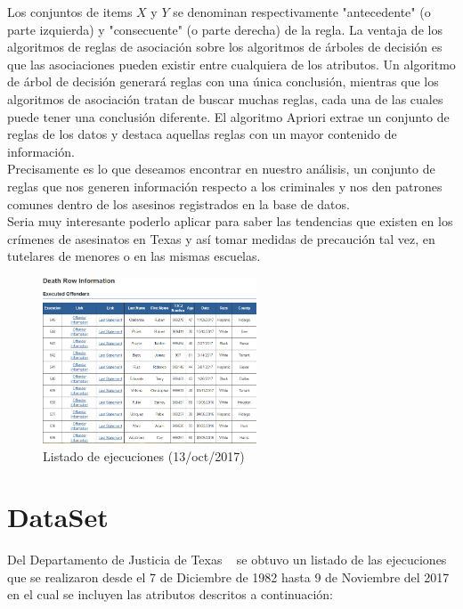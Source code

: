 \documentclass[sigconf]{acmart}
\begin{document}
Los conjuntos de items $X$ y $Y$ se denominan respectivamente "antecedente" (o parte izquierda) y "consecuente" (o parte derecha) de la regla.
La ventaja de los algoritmos de reglas de asociación sobre los algoritmos de árboles de decisión es que las asociaciones pueden existir entre cualquiera de los atributos. Un algoritmo de árbol de decisión generará reglas con una única conclusión, mientras que los algoritmos de asociación tratan de buscar muchas reglas, cada una de las cuales puede tener una conclusión diferente.
El algoritmo Apriori extrae un conjunto de reglas de los datos y destaca aquellas reglas con un mayor contenido de información.\\ Precisamente es lo que deseamos encontrar en nuestro análisis, un conjunto de reglas que nos generen información respecto a los criminales y nos den patrones comunes dentro de los asesinos registrados en la base de datos.\\Seria muy interesante poderlo aplicar para saber las tendencias que existen en los crímenes de asesinatos en Texas y así tomar medidas de precaución tal vez, en tutelares de menores o en las mismas escuelas.
\begin{figure}[ht]
  \centering
  \includegraphics[width=2.5in]{d.PNG}
  \caption{Listado de ejecuciones (13/oct/2017)}
\end{figure}

\section{DataSet}
Del Departamento de Justicia de Texas ~\cite{DeathRow} se obtuvo un listado de las ejecuciones que se realizaron desde el 7 de Diciembre de 1982 hasta 9 de Noviembre del 2017 en el cual se incluyen las atributos descritos a continuación:
\end{document}
